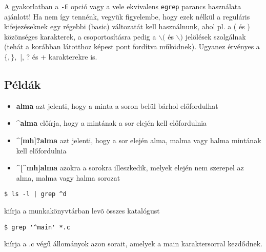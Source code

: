 A gyakorlatban a \texttt{-E} opció vagy a vele ekvivalens \texttt{egrep} parancs használata ajánlott! 
Ha nem így tennénk, vegyük figyelembe, hogy ezek nélkül a reguláris kifejezéseknek egy régebbi 
(basic) változatát kell használnunk, ahol pl. a ( és ) közönséges karakterek, a csoportosításra pedig a 
$\backslash($ és $\backslash)$ jelölések szolgálnak (tehát a korábban látotthoz képest pont fordítva működnek).
 Ugyanez érvényes a $\{, \},$ |, ? és + karakterekre is.

\subsection{Példák}
\begin{itemize}
 \item \textbf{alma} azt jelenti, hogy a minta a soron belül bárhol előfordulhat
 \item \textbf{\textasciicircum alma} előírja, hogy a mintának a sor elején kell előfordulnia
\item \textbf{\textasciicircum [mh]?alma} azt jelenti, hogy a sor elején alma, malma vagy halma mintának kell előfordulnia
\item \textbf{\textasciicircum [\textasciicircum mh]alma}
  azokra a sorokra illeszkedik, melyek elején nem szerepel az alma, malma vagy halma sorozat
\end{itemize}

\begin{lstlisting}
$ ls -l | grep ^d
\end{lstlisting}
kiírja a munkakönyvtárban levõ összes katalógust

\begin{lstlisting}
$ grep '^main' *.c 
\end{lstlisting}
kiírja a .c végű állományok azon sorait, amelyek a main karaktersorral kezdődnek.


